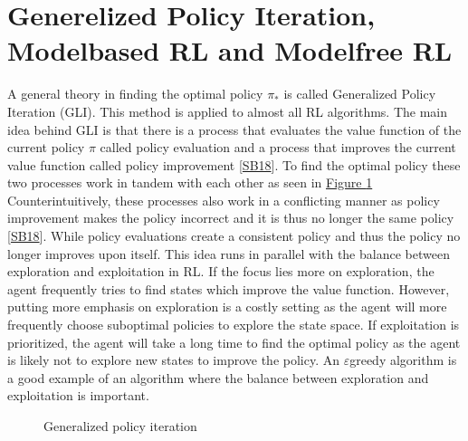 \documentclass[letterpaper,10pt,english]{jupyterBook}
\let\sphinxpxdimen\pdfpxdimen\else\newdimen\sphinxpxdimen
\begin{document}
\section{Generelized Policy Iteration, Model\sphinxhyphen{}based RL and Model\sphinxhyphen{}free RL}
\label{\detokenize{Reinforcement_learning:generelized-policy-iteration-model-based-rl-and-model-free-rl}}
\sphinxAtStartPar
A general theory in finding the optimal policy \(\pi_*\) is called Generalized Policy Iteration (GLI). This method is applied to almost all RL algorithms. The main idea behind GLI is that there is a process that evaluates the value function of the current policy \(\pi\) called policy evaluation and a process that improves the current value function called policy improvement {[}\hyperlink{cite.Discussion:id57}{SB18}{]}. To find the optimal policy these two processes work in tandem with each other as seen in \hyperref[\detokenize{Reinforcement_learning:gpi-fig}]{Figure \ref{\detokenize{Reinforcement_learning:gpi-fig}}} Counterintuitively, these processes also work in a conflicting manner as policy improvement makes the policy incorrect and it is thus no longer the same policy {[}\hyperlink{cite.Discussion:id57}{SB18}{]}. While policy evaluations create a consistent policy and thus the policy no longer improves upon itself. This idea runs in parallel with the balance between exploration and exploitation in RL.  If the focus lies more on exploration, the agent frequently tries to find states which improve the value function. However, putting more emphasis on exploration is a costly setting as the agent will more frequently choose suboptimal policies to explore the state space. If exploitation is prioritized, the agent will take a long time to find the optimal policy as the agent is likely not to explore new states to improve the policy.  An \(\varepsilon\)\sphinxhyphen{}greedy algorithm is a good example of an algorithm where the balance between exploration and exploitation is important.

\begin{figure}[htbp]
\centering
\capstart

\noindent\sphinxincludegraphics[width=500\sphinxpxdimen,height=300\sphinxpxdimen]{{GPI}.png}
\caption{Generalized policy iteration}\label{\detokenize{Reinforcement_learning:gpi-fig}}\end{figure}
\end{document}
